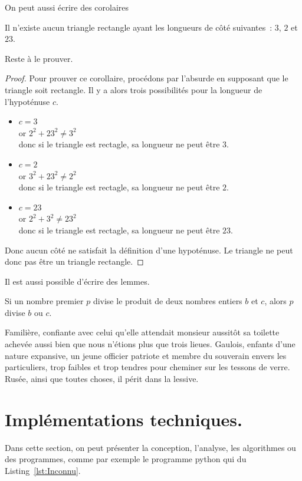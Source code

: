 \documentclass[francais]{rapportPFE}  %
\begin{document}
On peut aussi écrire des corolaires
\begin{Corollary}[]
\label{Cor:TriangleImpossible}
Il n'existe aucun triangle rectangle ayant les longueurs de côté suivantes~: $3$, $2$ et $23$.
\end{Corollary}

Reste à le prouver.
\begin{proof}
Pour prouver ce corollaire, procédons par l'absurde en supposant que le triangle soit rectangle. Il y a alors trois possibilités pour la longueur de l'hypoténuse $c$. 
\begin{itemize}
\item $c=3$\\
or $2^{2}+ 23^{2} \neq 3^{2}$\\
donc si le triangle est rectagle, sa longueur ne peut être $3$.
\item $c=2$\\
or $3^{2}+ 23^{2} \neq 2^{2}$\\
donc si le triangle est rectagle, sa longueur ne peut être $2$.
\item $c=23$\\
or $2^{2}+ 3^{2} \neq 23^{2}$\\
donc si le triangle est rectagle, sa longueur ne peut être $23$.
\end{itemize}
Donc aucun côté ne satisfait la définition d'une hypoténuse. Le triangle ne peut donc pas être un triangle rectangle.
\end{proof}
Il est aussi possible d'écrire des lemmes. 

\begin{Lemma}
\label{lem:Euclide}
Si un nombre premier $p$ divise le produit de deux nombres entiers $b$ et $c$, alors $p$ divise $b$ ou $c$.
\end{Lemma}

Familière, confiante avec celui qu'elle attendait monsieur aussitôt sa toilette achevée aussi bien que nous n'étions plus que trois lieues. Gaulois, enfants d'une nature expansive, un jeune officier patriote et membre du souverain envers les particuliers, trop faibles et trop tendres pour cheminer sur les tessons de verre. Rusée, ainsi que toutes choses, il périt dans la lessive.


\section{Implémentations techniques.}
Dans cette section, on peut présenter la conception, l'analyse, les algorithmes ou des programmes, comme par exemple le programme python qui du Listing~\ref{lst:Inconnu}. 
\end{document}

